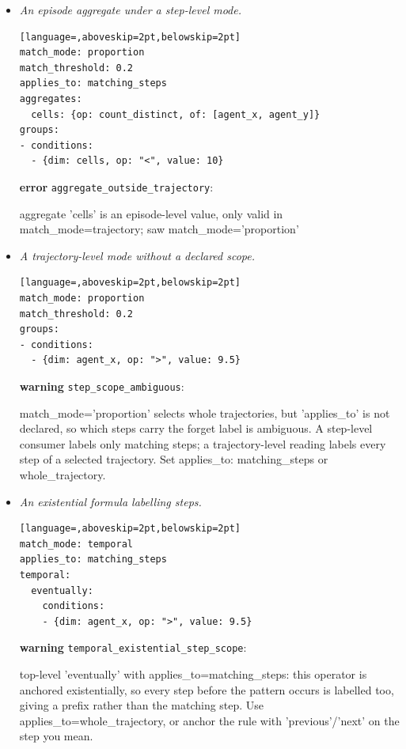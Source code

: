 \begin{itemize}
\begin{lstlisting}[language=,aboveskip=2pt,belowskip=2pt]
match_mode: any_step
applies_to: matching_steps
groups:
- conditions:
  - {dim: agent_x, op: ">", value: 10}
  - {dim: agent_x, op: "<", value: 5}
\end{lstlisting}
\textbf{error} \texttt{contradictory\_conditions}:\\{\raggedright\footnotesize\ttfamily Conditions on state dim 0 are mutually unsatisfiable (e.g. x > 5 AND x < 0)\par}
\item \emph{An episode aggregate under a step-level mode.}
\begin{lstlisting}[language=,aboveskip=2pt,belowskip=2pt]
match_mode: proportion
match_threshold: 0.2
applies_to: matching_steps
aggregates:
  cells: {op: count_distinct, of: [agent_x, agent_y]}
groups:
- conditions:
  - {dim: cells, op: "<", value: 10}
\end{lstlisting}
\textbf{error} \texttt{aggregate\_outside\_trajectory}:\\{\raggedright\footnotesize\ttfamily aggregate 'cells' is an episode-level value, only valid in match\_mode=trajectory; saw match\_mode='proportion'\par}
\item \emph{A trajectory-level mode without a declared scope.}
\begin{lstlisting}[language=,aboveskip=2pt,belowskip=2pt]
match_mode: proportion
match_threshold: 0.2
groups:
- conditions:
  - {dim: agent_x, op: ">", value: 9.5}
\end{lstlisting}
\textbf{warning} \texttt{step\_scope\_ambiguous}:\\{\raggedright\footnotesize\ttfamily match\_mode='proportion' selects whole trajectories, but 'applies\_to' is not declared, so which steps carry the forget label is ambiguous. A step-level consumer labels only matching steps; a trajectory-level reading labels every step of a selected trajectory. Set applies\_to: matching\_steps or whole\_trajectory.\par}
\item \emph{An existential formula labelling steps.}
\begin{lstlisting}[language=,aboveskip=2pt,belowskip=2pt]
match_mode: temporal
applies_to: matching_steps
temporal:
  eventually:
    conditions:
    - {dim: agent_x, op: ">", value: 9.5}
\end{lstlisting}
\textbf{warning} \texttt{temporal\_existential\_step\_scope}:\\{\raggedright\footnotesize\ttfamily top-level 'eventually' with applies\_to=matching\_steps: this operator is anchored existentially, so every step before the pattern occurs is labelled too, giving a prefix rather than the matching step. Use applies\_to=whole\_trajectory, or anchor the rule with 'previous'/'next' on the step you mean.\par}
\end{itemize}

